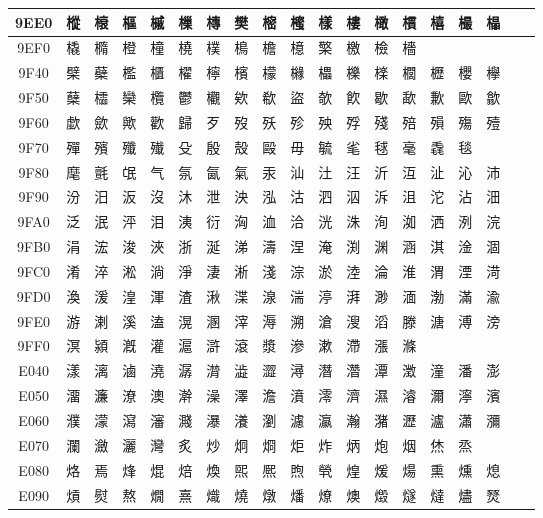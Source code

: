 \begin{table}[H]
\begin{tabular}{|Sc|*{16}{>{\centering\arraybackslash}p{1em}|}>{\centering\arraybackslash}p{2.5em}|}
9EE0 & 樅 & 榱 & 樞 & 槭 & 樔 & 槫 & 樊 & 樒 & 櫁 & 樣 & 樓 & 橄 & 樌 & 橲 & 樶 & 橸 \\ \hline
9EF0 & 橇 & 橢 & 橙 & 橦 & 橈 & 樸 & 樢 & 檐 & 檍 & 檠 & 檄 & 檢 & 檣 & & & \\ \hline
9F40 & 檗 & 蘗 & 檻 & 櫃 & 櫂 & 檸 & 檳 & 檬 & 櫞 & 櫑 & 櫟 & 檪 & 櫚 & 櫪 & 櫻 & 欅 \\ \hline
9F50 & 蘖 & 櫺 & 欒 & 欖 & 鬱 & 欟 & 欸 & 欷 & 盜 & 欹 & 飮 & 歇 & 歃 & 歉 & 歐 & 歙 \\ \hline
9F60 & 歔 & 歛 & 歟 & 歡 & 歸 & 歹 & 歿 & 殀 & 殄 & 殃 & 殍 & 殘 & 殕 & 殞 & 殤 & 殪 \\ \hline
9F70 & 殫 & 殯 & 殲 & 殱 & 殳 & 殷 & 殼 & 毆 & 毋 & 毓 & 毟 & 毬 & 毫 & 毳 & 毯 & \\ \hline
9F80 & 麾 & 氈 & 氓 & 气 & 氛 & 氤 & 氣 & 汞 & 汕 & 汢 & 汪 & 沂 & 沍 & 沚 & 沁 & 沛 \\ \hline
9F90 & 汾 & 汨 & 汳 & 沒 & 沐 & 泄 & 泱 & 泓 & 沽 & 泗 & 泅 & 泝 & 沮 & 沱 & 沾 & 沺 \\ \hline
9FA0 & 泛 & 泯 & 泙 & 泪 & 洟 & 衍 & 洶 & 洫 & 洽 & 洸 & 洙 & 洵 & 洳 & 洒 & 洌 & 浣 \\ \hline
9FB0 & 涓 & 浤 & 浚 & 浹 & 浙 & 涎 & 涕 & 濤 & 涅 & 淹 & 渕 & 渊 & 涵 & 淇 & 淦 & 涸 \\ \hline
9FC0 & 淆 & 淬 & 淞 & 淌 & 淨 & 淒 & 淅 & 淺 & 淙 & 淤 & 淕 & 淪 & 淮 & 渭 & 湮 & 渮 \\ \hline
9FD0 & 渙 & 湲 & 湟 & 渾 & 渣 & 湫 & 渫 & 湶 & 湍 & 渟 & 湃 & 渺 & 湎 & 渤 & 滿 & 渝 \\ \hline
9FE0 & 游 & 溂 & 溪 & 溘 & 滉 & 溷 & 滓 & 溽 & 溯 & 滄 & 溲 & 滔 & 滕 & 溏 & 溥 & 滂 \\ \hline
9FF0 & 溟 & 潁 & 漑 & 灌 & 滬 & 滸 & 滾 & 漿 & 滲 & 漱 & 滯 & 漲 & 滌 & & & \\ \hline
E040 & 漾 & 漓 & 滷 & 澆 & 潺 & 潸 & 澁 & 澀 & 潯 & 潛 & 濳 & 潭 & 澂 & 潼 & 潘 & 澎 \\ \hline
E050 & 澑 & 濂 & 潦 & 澳 & 澣 & 澡 & 澤 & 澹 & 濆 & 澪 & 濟 & 濕 & 濬 & 濔 & 濘 & 濱 \\ \hline
E060 & 濮 & 濛 & 瀉 & 瀋 & 濺 & 瀑 & 瀁 & 瀏 & 濾 & 瀛 & 瀚 & 潴 & 瀝 & 瀘 & 瀟 & 瀰 \\ \hline
E070 & 瀾 & 瀲 & 灑 & 灣 & 炙 & 炒 & 炯 & 烱 & 炬 & 炸 & 炳 & 炮 & 烟 & 烋 & 烝 & \\ \hline
E080 & 烙 & 焉 & 烽 & 焜 & 焙 & 煥 & 煕 & 熈 & 煦 & 煢 & 煌 & 煖 & 煬 & 熏 & 燻 & 熄 \\ \hline
E090 & 熕 & 熨 & 熬 & 燗 & 熹 & 熾 & 燒 & 燉 & 燔 & 燎 & 燠 & 燬 & 燧 & 燵 & 燼 & 燹 \\ \hline

\end{tabular}
\end{table}
